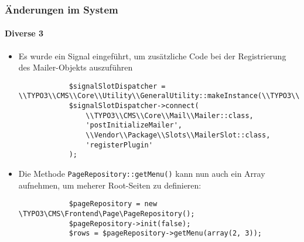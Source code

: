 \begin{frame}[fragile]
	\frametitle{Änderungen im System}
	\framesubtitle{Diverse 3}

	\lstset{
		basicstyle=\tiny\ttfamily
	}

	\begin{itemize}
		\item Es wurde ein Signal eingeführt, um zusätzliche Code bei der Registrierung des Mailer-Objekts auszuführen
		\begin{lstlisting}
			$signalSlotDispatcher = \\TYPO3\\CMS\\Core\\Utility\\GeneralUtility::makeInstance(\\TYPO3\\CMS\\Extbase\\SignalSlot\\Dispatcher::class);
			$signalSlotDispatcher->connect(
				\\TYPO3\\CMS\\Core\\Mail\\Mailer::class,
				'postInitializeMailer',
				\\Vendor\\Package\\Slots\\MailerSlot::class,
				'registerPlugin'
			);
		\end{lstlisting}
		\item Die Methode \texttt{PageRepository::getMenu()} kann nun auch ein Array aufnehmen, um meherer Root-Seiten zu definieren:
		\begin{lstlisting}
			$pageRepository = new \TYPO3\CMS\Frontend\Page\PageRepository();
    		$pageRepository->init(false);
    		$rows = $pageRepository->getMenu(array(2, 3));

		\end{lstlisting}
		
	\end{itemize}

\end{frame}

